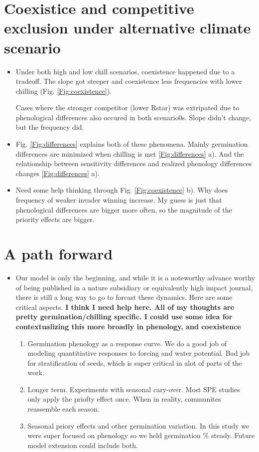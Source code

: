 \documentclass{article}[12pt]
\begin{document}
\section{Coexistice and competitive exclusion under alternative climate scenario}
\begin{itemize}
\item Under both high and low chill scenarios, coexistence happened due to a tradeoff. The slope got steeper and coexistence less frequencies with lower chilling (Fig. \ref{Fig:coexistence}). 

Cases where the stronger competitor (lower Rstar) was extripated due to phenological differences also occured in both scenario0s. Slope didn't change, but the frequency did.

\item Fig. \ref{Fig:differences} explains both of these phenomena. Mainly germination differences are minimized when chilling is met \ref{Fig:differences} a). And the relationship between sensitivity differences and realized phenology differences changes \ref{Fig:differences} a).

\item Need some help thinking through Fig. \ref{Fig:coexistence} b). Why does frequency of weaker invader winning increase. My guess is just that phenological differences are bigger more often, so the magnitude of the priority effects are bigger. 
\end{itemize}

\section{A path forward}
\begin{itemize}
\item Our model is only the beginning, and while it is a noteworthy advance worthy of being published in a nature subsidiary or equivalently high impact journal, there is still a long way to go to forcast these dynamics. Here are some critical aspects.
\textbf{I think I need help here. All of my thoughts are pretty germination/chilling specific. I could use some idea for contextualizing this more broadly in phenology, and coexistence}
\begin{enumerate}
\item Germination phenology as a response curve. We do a good job of modeling quantitiative responses to forcing and water potential. Bad job for stratification of seeds, which is super critical in alot of parts of the work.
\item Longer term. Experiments with seasonal cary-over. Most SPE studies only apply the priofty effect once. When in reality, communites reassemble each season.
\item Seasonal priory effects and other germination variation. In this study we were super focused on phenology so we held germination \% steady. Future model extension could include both.
\end{enumerate}
\end{itemize}
\pagebreak
\end{document}
